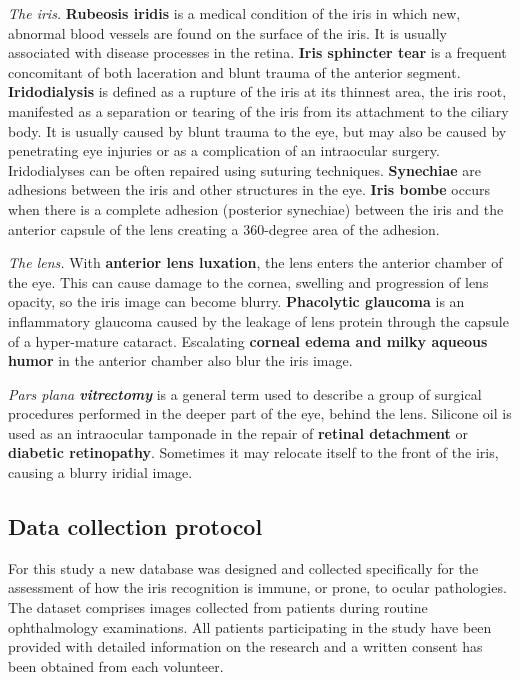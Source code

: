 \documentclass[10pt,twocolumn,letterpaper]{article}
\begin{document}
\textit{The iris.} \textbf{Rubeosis iridis} is a medical condition of the iris in which new, abnormal blood vessels are found on the surface of the iris. It is usually associated with disease processes in the retina. \textbf{Iris sphincter tear} is a frequent concomitant of both laceration and blunt trauma of the anterior segment. \textbf{Iridodialysis} is defined as a rupture of the iris at its thinnest area, the iris root, manifested as a separation or tearing of the iris from its attachment to the ciliary body. It is usually caused by blunt trauma to the eye, but may also be caused by penetrating eye injuries or as a complication of an intraocular surgery. Iridodialyses can be often repaired using suturing techniques. \textbf{Synechiae} are adhesions between the iris and other structures in the eye. \textbf{Iris bombe} occurs when there is a complete adhesion (posterior synechiae) between the iris and the anterior capsule of the lens creating a 360-degree area of the adhesion.

\textit{The lens.} With \textbf{anterior lens luxation}, the lens enters the anterior chamber of the eye. This can cause damage to the cornea, swelling and progression of lens opacity, so the iris image can become blurry. \textbf{Phacolytic glaucoma} is an inflammatory glaucoma caused by the leakage of lens protein through the capsule of a hyper-mature cataract. Escalating \textbf{corneal edema and milky aqueous humor} in the anterior chamber also blur the iris image.

\emph{Pars plana \textbf{vitrectomy}} is a general term used to describe a group of surgical procedures performed in the deeper part of the eye, behind the lens. Silicone oil is used as an intraocular tamponade in the repair of {\bf retinal detachment} or {\bf diabetic retinopathy}. Sometimes it may relocate itself to the front of the iris, causing a blurry iridial image.

\subsection{Data collection protocol}
For this study a new database was designed and collected specifically for the assessment of how the iris recognition is immune, or prone, to ocular pathologies. The dataset comprises images collected from patients during routine ophthalmology examinations. All patients participating in the study have been provided with detailed information on the research and a written consent has been obtained from each volunteer.
\end{document}
